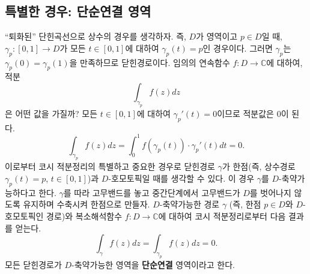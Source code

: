 \subsection{특별한 경우: 단순연결 영역}

``퇴화된'' 단힌곡선으로 상수의 경우를 생각하자.
즉, $D$가 영역이고 $p\in D$일 때,
$\gamma_p:[0,1] \to D$가 모든 $t\in[0,1]$에 대하여 $\gamma_p(t)=p$인 경우이다.
그러면 $\gamma_p$는 $\gamma_p(0)=\gamma_p(1)$을 만족하므로 닫힌경로이다.
임의의 연속함수 $f:D\to\mathbb C$에 대하여, 적분
\[
\int_{\gamma_p} f(z)dz
\]
은 어떤 값을 가질까? 
모든 $t\in[0,1]$에 대하여 $\gamma_p'(t)=0$이므로 적분값은
$0$이 된다.
\[
\int_{\gamma_p} f(z)dz = \int_0^1 f(\gamma_p(t))\cdot \gamma_p'(t)dt = 0.
\]
이로부터 코시 적분정리의 특별하고 중요한 경우로
닫힌경로 $\gamma$가 한점(즉, 상수경로 $\gamma_p(t)=p$, $t\in[0,1]$)과 
$D$-호모토픽일 때를 생각할 수 있다.
이 경우  $\gamma$를  $D$-축약가능하다고 한다.
$\gamma$를 따라 고무밴드를 놓고 
중간단계에서 고무밴드가 $D$를 벗어나지 않도록 유지하며 수축시켜 한점으로 만들자. 
$D$-축약가능한 경로 $\gamma$ (즉, 한점 $p\in D$와 $D$-호모토픽인 경로)와
복소해석함수 $f:D \to \mathbb C$에 대하여
코시 적분정리로부터 다음 결과를 얻는다.
\[
\int_\gamma f(z) dz = \int_{\gamma_p} f(z) dz = 0.
\]
모든 닫힌경로가 $D$-축약가능한 영역을 {\bf 단순연결} 영역이라고 한다.

